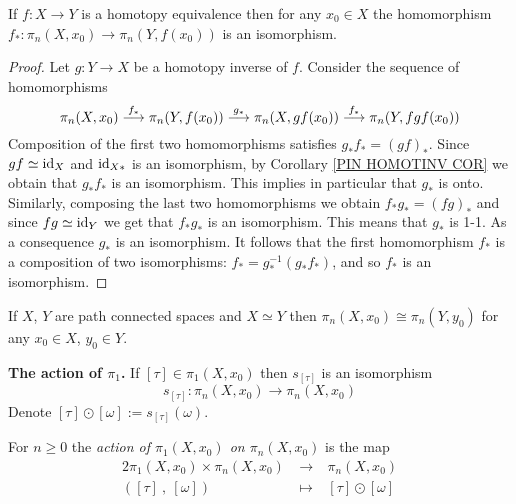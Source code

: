 \begin{proposition}
\label{HOMOTEQ PIN PROP}
If $f\colon X \to Y$ is a homotopy equivalence then for any $x_{0}\in X$ the homomorphism 
$f_{\ast}\colon \pi_{n}(X, x_{0}) \to \pi_{n}(Y, f(x_{0}))$ is an isomorphism. 
\end{proposition}

\begin{proof}
Let $g\colon Y \to X$ be a homotopy inverse of $f$. Consider the sequence of homomorphisms 
$$\pi_{n}(X, x_{0}) \overset{f_{\ast}}{\longrightarrow} \pi_{n}(Y, f(x_{0})) 
\overset{g_{\ast}}{\longrightarrow} \pi_{n}(X, gf(x_{0}))
\overset{f_{\ast}}{\longrightarrow} \pi_{n}(Y, fgf(x_{0})) $$
Composition of the first two homomorphisms satisfies $g_{\ast}f_{\ast} = (gf)_{\ast}$. Since 
$gf\simeq \mathrm{id}_{X}$ and $\mathrm{id}_{X\ast}$ is an isomorphism, by Corollary \ref{PIN HOMOTINV COR}
we obtain that $g_{\ast}f_{\ast}$ is an isomorphism. This implies in particular that $g_{\ast}$ is onto. 
Similarly, composing the last two homomorphisms we obtain $f_{\ast}g_{\ast} = (fg)_{\ast}$
and since $fg\simeq \mathrm{id}_{Y}$ we get that $f_{\ast}g_{\ast}$ is an isomorphism. This means
that $g_{\ast}$ is 1-1. As a consequence $g_{\ast}$ is an isomorphism. It follows that the first 
homomorphism $f_{\ast}$ is a composition of two isomorphisms: $f_{\ast} = g_{\ast}^{-1}(g_{\ast}f_{\ast})$, 
and so $f_{\ast}$ is an isomorphism. 
\end{proof}


\begin{corollary}
\label{PATHCON HOMOTEQ PIN ISO COR}
If $X$, $Y$ are path connected spaces and $X \simeq Y$ then 
$\pi_{n}(X, x_{0}) \cong \pi_{n}(Y, y_{0})$ for any $x_{0}\in X$, $y_{0}\in Y$. 
\end{corollary}


\begin{nn}{\bf The action of $\pi_{1}$.}
\label{PI1 ACTION NN}
If $[\tau]\in \pi_{1}(X, x_{0})$ then $s_{[\tau]}$ is an isomorphism 
\[
s_{[\tau]} \colon \pi_{n}(X, x_{0}) \to \pi_{n}(X, x_{0})
\]
Denote $[\tau]\odot [\omega] := s_{[\tau]}(\omega)$.
\end{nn}

\begin{definition}
For $n\geq 0$ the \emph{action of $\pi_{1}(X, x_{0})$ on $\pi_{n}(X, x_{0})$}
is the map  
\begin{alignat*}{2}
\pi_{1}(X, x_{0}) \times \pi_{n}(X, x_{0}) & \  \to\  & \pi_{n}(X, x_{0}) \\
([\tau]\ ,\  [\omega]) \ \ \ \ \ \ \  &  \ \mapsto\  & [\tau]\odot [\omega] \\
\end{alignat*}
\end{definition} 

